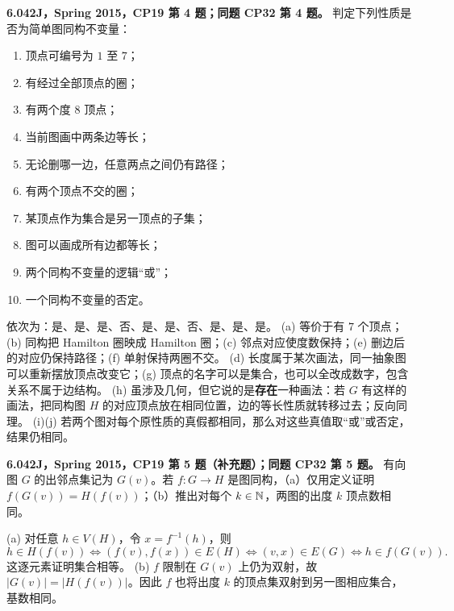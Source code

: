 \begin{exercise}\label{mit:6042-cp19-q4}\label{mit:6042-cp32-q4}
\textbf{6.042J，Spring 2015，CP19 第 4 题；同题 CP32 第 4 题。}
判定下列性质是否为简单图同构不变量：
\begin{enumerate}[label=(\alph*)]
\item 顶点可编号为 $1$ 至 $7$；\item 有经过全部顶点的圈；\item 有两个度 $8$ 顶点；
\item 当前图画中两条边等长；\item 无论删哪一边，任意两点之间仍有路径；
\item 有两个顶点不交的圈；\item 某顶点作为集合是另一顶点的子集；
\item 图可以画成所有边都等长；\item 两个同构不变量的逻辑“或”；\item 一个同构不变量的否定。
\end{enumerate}
\end{exercise}
\begin{solution}
依次为：是、是、是、否、是、是、否、是、是、是。
(a) 等价于有 $7$ 个顶点；(b) 同构把 Hamilton 圈映成 Hamilton 圈；(c) 邻点对应使度数保持；(e) 删边后的对应仍保持路径；(f) 单射保持两圈不交。
(d) 长度属于某次画法，同一抽象图可以重新摆放顶点改变它；(g) 顶点的名字可以是集合，也可以全改成数字，包含关系不属于边结构。
(h) 虽涉及几何，但它说的是\textbf{存在}一种画法：若 $G$ 有这样的画法，把同构图 $H$ 的对应顶点放在相同位置，边的等长性质就转移过去；反向同理。
(i)(j) 若两个图对每个原性质的真假都相同，那么对这些真值取“或”或否定，结果仍相同。
\end{solution}

\begin{exercise}\label{mit:6042-cp19-q5}\label{mit:6042-cp32-q5}
\textbf{6.042J，Spring 2015，CP19 第 5 题（补充题）；同题 CP32 第 5 题。}
有向图 $G$ 的出邻点集记为 $G(v)$。若 $f:G\to H$ 是图同构，（a）仅用定义证明 $f(G(v))=H(f(v))$；（b）推出对每个 $k\in\mathbb N$，两图的出度 $k$ 顶点数相同。
\end{exercise}
\begin{solution}
(a) 对任意 $h\in V(H)$，令 $x=f^{-1}(h)$，则
\[
h\in H(f(v))\iff(f(v),f(x))\in E(H)
\iff(v,x)\in E(G)\iff h\in f(G(v)).
\]
这逐元素证明集合相等。
(b) $f$ 限制在 $G(v)$ 上仍为双射，故 $|G(v)|=|H(f(v))|$。因此 $f$ 也将出度 $k$ 的顶点集双射到另一图相应集合，基数相同。
\end{solution}

